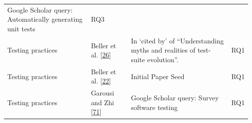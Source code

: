 \documentclass[]{book}
\begin{document}
\begin{longtable}[]{@{}llll@{}}
\begin{minipage}[t]{0.50\columnwidth}
Google Scholar query: Automatically generating unit tests\strut
\end{minipage} & \begin{minipage}[t]{0.04\columnwidth}\raggedright\strut
RQ3\strut
\end{minipage}\tabularnewline
\begin{minipage}[t]{0.18\columnwidth}\raggedright\strut
Testing practices\strut
\end{minipage} & \begin{minipage}[t]{0.16\columnwidth}\raggedright\strut
Beller et al. {[}\protect\hyperlink{ref-beller2015}{26}{]}\strut
\end{minipage} & \begin{minipage}[t]{0.50\columnwidth}\raggedright\strut
In `cited by' of ``Understanding myths and realities of test-suite
evolution''.\strut
\end{minipage} & \begin{minipage}[t]{0.04\columnwidth}\raggedright\strut
RQ1\strut
\end{minipage}\tabularnewline
\begin{minipage}[t]{0.18\columnwidth}\raggedright\strut
Testing practices\strut
\end{minipage} & \begin{minipage}[t]{0.16\columnwidth}\raggedright\strut
Beller et al.
{[}\protect\hyperlink{ref-beller2017developer}{22}{]}\strut
\end{minipage} & \begin{minipage}[t]{0.50\columnwidth}\raggedright\strut
Initial Paper Seed\strut
\end{minipage} & \begin{minipage}[t]{0.04\columnwidth}\raggedright\strut
RQ1\strut
\end{minipage}\tabularnewline
\begin{minipage}[t]{0.18\columnwidth}\raggedright\strut
Testing practices\strut
\end{minipage} & \begin{minipage}[t]{0.16\columnwidth}\raggedright\strut
Garousi and Zhi {[}\protect\hyperlink{ref-GAROUSI20131354}{71}{]}\strut
\end{minipage} & \begin{minipage}[t]{0.50\columnwidth}\raggedright\strut
Google Scholar query: Survey software testing\strut
\end{minipage} & \begin{minipage}[t]{0.04\columnwidth}\raggedright\strut
RQ1\strut
\end{minipage}\tabularnewline

\end{longtable}
\end{document}
